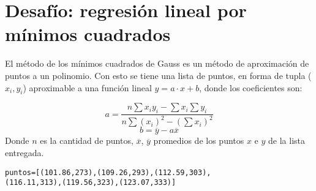 \section{Desafío: regresión lineal por mínimos cuadrados}

El método de los mínimos cuadrados de Gauss es un método de aproximación de puntos a un polinomio. Con esto se tiene una lista de puntos, en forma de tupla ($x_{i},y_{i}$) aproximable a una función lineal $y=a \cdot x + b$, donde los coeficientes son:

\begin{displaymath}
	a= \frac{n \sum x_{i} y_{i} - \sum x_{i} \sum y_{i}}
	{n \sum (x_{i})^{2} -(\sum x_{i})^{2}}
\end{displaymath}
\begin{displaymath}
	b=\overline{y} - a \overline{x}
\end{displaymath}
Donde $n$ es la cantidad de puntos, $\overline{x}$, $\overline{y}$ promedios de los puntos $x$ e $y$ de la lista entregada.
\begin{lstlisting}[style=consola]
puntos=[(101.86,273),(109.26,293),(112.59,303),
(116.11,313),(119.56,323),(123.07,333)]
\end{lstlisting}